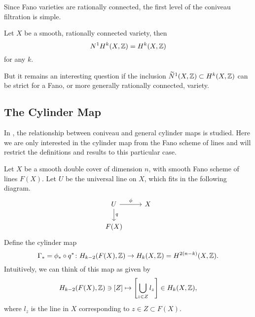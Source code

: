 Since Fano varieties are rationally connected, the first level of the coniveau filtration is simple.
\begin{proposition}
\label{lem:VoisinRegularConiveauDoubleCover}
  Let $X$ be a smooth, rationally connected variety, then 
\[N^1H^k(X,\mathbb{Z}) = H^k(X,\mathbb{Z}) \]
for any $k$.
\end{proposition}
But it remains an interesting question if the inclusion $\widetilde{N}^1(X,\mathbb{Z}) \subset H^k(X,\mathbb{Z})$ can be strict for a Fano, or more generally rationally connected, variety.

\subsection{The Cylinder Map}
In \cite[Section 1]{VoisinConiveauThreefolds}, the relationship between coniveau and general cylinder maps is studied. Here we are only interested in the cylinder map from the Fano scheme of lines and will restrict the definitions and results to this particular case.

Let $X$ be a smooth double cover of dimension $n$, with smooth Fano scheme of lines $F(X)$. Let $U$ be the universal line on $X$, which fits in the following diagram.
\begin{equation}
  \label{eq:UniversalLine}
  \begin{tikzcd}
  U \arrow["q"]{d} \arrow["\phi"]{r} & X \\
  F(X) & 
  \end{tikzcd}
\end{equation}
Define the cylinder map
\[\Gamma_* = \phi_* \circ q^* \colon H_{k-2}(F(X),\mathbb{Z}) \to H_k(X,\mathbb{Z}) = H^{2(n-k)}(X,\mathbb{Z}).\]
Intuitively, we can think of this map as given by
\begin{equation}
H_{k-2}(F(X),\mathbb{Z}) \ni [Z] \mapsto \left[\bigcup_{z \in Z} l_z\right] \in H_k(X,\mathbb{Z}),
\end{equation}
where $l_z$ is the line in $X$ corresponding to $z \in Z \subset F(X)$.

